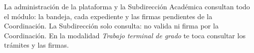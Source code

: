 \documentclass[11pt,a4paper]{article}
\begin{document}
{\small\tableofcontents}
\newpage
\begin{quevasahacer}
La administración de la plataforma y la Subdirección Académica consultan todo el módulo: la bandeja, cada expediente y las firmas pendientes de la Coordinación. La Subdirección solo consulta: no valida ni firma por la Coordinación. En la modalidad \emph{Trabajo terminal de grado} te toca consultar los trámites y las firmas.
\end{quevasahacer}




\end{document}
